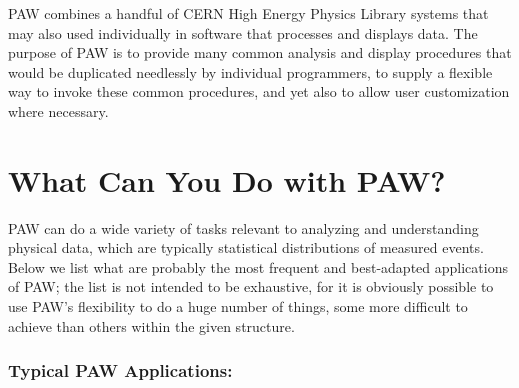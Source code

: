 PAW combines a handful of CERN High Energy Physics Library systems that may also
used individually in software that processes and displays data. The purpose of 
PAW is to provide many common analysis and display procedures that would be 
duplicated needlessly by individual programmers, to supply a flexible way to 
invoke these common procedures, and yet also to allow user customization where
necessary.
 
\section{What Can You Do with PAW?}
 
PAW can do a wide variety of tasks relevant to analyzing and understanding 
physical data, which are typically statistical distributions of measured events.
Below we list what are probably the most frequent and best-adapted applications
of PAW; the list is not intended to be exhaustive, for it is obviously possible
to use PAW's flexibility to do a huge number of things, some more difficult to 
achieve than others within the given structure.
 
\subsubsection*{Typical PAW Applications:}
 
